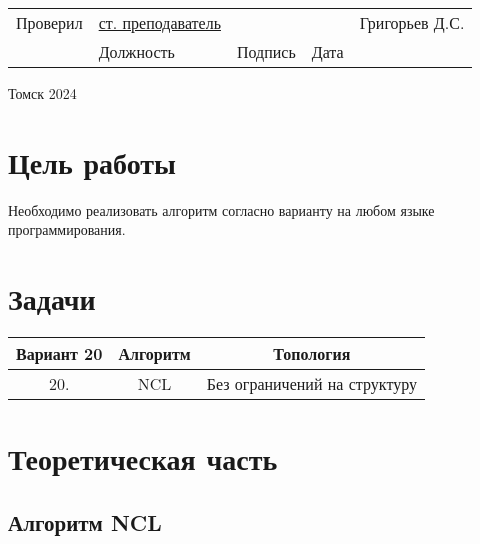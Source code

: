 \documentclass[12pt]{extarticle}
\begin{document}
\begin{titlepage}
    \vspace{2cm}
    
    \begin{tabular}{p{3cm} p{4cm} p{2cm} p{2cm} p{4cm} }
        Проверил & \underline{ст. преподаватель} & \hrulefill & \hrulefill & Григорьев Д.С. \\
         & \centering\small Должность & \centering\small Подпись & \centering\small Дата &  \\
    \end{tabular}

    \vspace{2cm}

    {\large Томск 2024 \\}

\end{titlepage}

\section{Цель работы}

Необходимо реализовать алгоритм согласно варианту на любом языке программирования.

\section{Задачи}

\begin{table}[h!]
\centering
\begin{tabular}{|c|c|c|} %
\hline %
Вариант 20 & Алгоритм & Топология \\ %
\hline %
20. & NCL & Без ограничений на структуру \\ %
\hline %
\end{tabular}
\end{table}

\section{Теоретическая часть}

\subsection{Алгоритм NCL}
\end{document}
